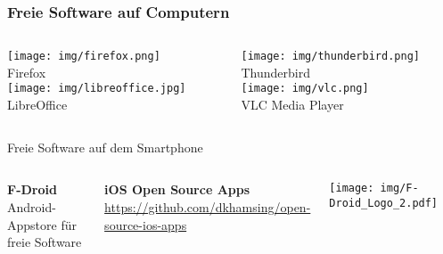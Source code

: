 \begin{frame}
  \frametitle{Freie Software auf Computern}
    \begin{columns}
        \begin{column}{5cm}
            \begin{center}
                \texttt{[image: img/firefox.png]} \\
                Firefox \\
                \vspace{0.1\textheight}
                \texttt{[image: img/libreoffice.jpg]}\\
                LibreOffice
            \end{center}
        \end{column}
        \begin{column}{5cm}
            \begin{center}
                \texttt{[image: img/thunderbird.png]} \\
                Thunderbird \\
                \vspace{0.1\textheight}
                \texttt{[image: img/vlc.png]}\\
                VLC Media Player
            \end{center}
        \end{column}
    \end{columns}
\end{frame}

\begin{frame}{Freie Software auf dem Smartphone}
  \begin{columns}
    \column{6.5cm}

    \textbf{F-Droid}\\
    Android-Appstore für freie Software

    \vspace{0.5cm}

    \textbf{iOS Open Source Apps}\\
    \url{https://github.com/dkhamsing/open-source-ios-apps}

    \column{5cm}

    \begin{center}
      \texttt{[image: img/F-Droid\_Logo\_2.pdf]}
    \par\end{center}
    \begin{center}
    \par\end{center}
  \end{columns}
\end{frame}
